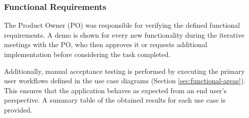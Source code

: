 \subsubsection{Functional Requirements}

The Product Owner (PO) was responsible for verifying the defined functional requirements. A demo is shown for every new functionality during the iterative meetings with the PO, who then approves it or requests additional implementation before considering the task completed.

Additionally, manual acceptance testing is performed by executing the primary user workflows defined in the use case diagrams (Section \ref{sec:functional-areas}). This ensures that the application behaves as expected from an end user's perspective. A summary table of the obtained results for each use case is provided.

\vspace{20pt}
    \pagestyle{fancy}
    \small

    \setlength{\tabcolsep}{2pt}
    \setlength{\arrayrulewidth}{0.1pt}
    \renewcommand{\arraystretch}{1.15}
    \setlength{\LTpre}{0pt}
    \setlength{\LTpost}{0pt}

    \setlength{\LTleft}{\fill}
    \setlength{\LTright}{\fill}

